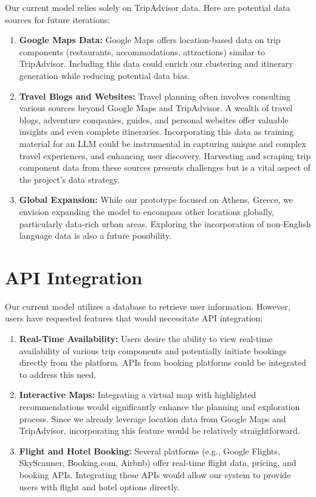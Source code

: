\documentclass[12pt,a4paper]{report}
\begin{document}
Our current model relies solely on TripAdvisor data. Here are potential data sources for future iterations:
\begin{enumerate}
\item{\textbf{Google Maps Data:} Google Maps offers location-based data on trip components (restaurants, accommodations, attractions) similar to TripAdvisor. Including this data could enrich our clustering and itinerary generation while reducing potential data bias.}
\item{\textbf{Travel Blogs and Websites:} Travel planning often involves consulting various sources beyond Google Maps and TripAdvisor. A wealth of travel blogs, adventure companies, guides, and personal websites offer valuable insights and even complete itineraries. Incorporating this data as training material for an LLM could be instrumental in capturing unique and complex travel experiences, and enhancing user discovery. Harvesting and scraping trip component data from these sources presents challenges but is a vital aspect of the project's data strategy.}
\item{\textbf{Global Expansion:} While our prototype focused on Athens, Greece, we envision expanding the model to encompass other locations globally, particularly data-rich urban areas. Exploring the incorporation of non-English language data is also a future possibility.}
\end{enumerate}
\section{API Integration}

Our current model utilizes a database to retrieve user information. However, users have requested features that would necessitate API integration:

\begin{enumerate}
\item{\textbf{Real-Time Availability:} Users desire the ability to view real-time availability of various trip components and potentially initiate bookings directly from the platform. APIs from booking platforms could be integrated to address this need.}
\item{\textbf{Interactive Maps:} Integrating a virtual map with highlighted recommendations would significantly enhance the planning and exploration process. Since we already leverage location data from Google Maps and TripAdvisor, incorporating this feature would be relatively straightforward.}
\item{\textbf{Flight and Hotel Booking:} Several platforms (e.g., Google Flights, SkyScanner, Booking.com, Airbnb) offer real-time flight data, pricing, and booking APIs. Integrating these APIs would allow our system to provide users with flight and hotel options directly.}
\end{enumerate}
\end{document}
